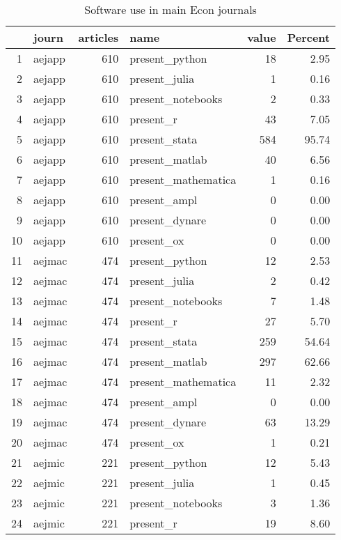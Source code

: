 \begin{table}[ht]
\centering
\caption{Software use in main Econ journals} 
\label{tab:software:byjournal}
\begin{tabular}{rlrlrr}
  \hline
 & journ & articles & name & value & Percent \\ 
  \hline
1 & aejapp & 610 & present\_python &  18 & 2.95 \\ 
  2 & aejapp & 610 & present\_julia &   1 & 0.16 \\ 
  3 & aejapp & 610 & present\_notebooks &   2 & 0.33 \\ 
  4 & aejapp & 610 & present\_r &  43 & 7.05 \\ 
  5 & aejapp & 610 & present\_stata & 584 & 95.74 \\ 
  6 & aejapp & 610 & present\_matlab &  40 & 6.56 \\ 
  7 & aejapp & 610 & present\_mathematica &   1 & 0.16 \\ 
  8 & aejapp & 610 & present\_ampl &   0 & 0.00 \\ 
  9 & aejapp & 610 & present\_dynare &   0 & 0.00 \\ 
  10 & aejapp & 610 & present\_ox &   0 & 0.00 \\ 
  11 & aejmac & 474 & present\_python &  12 & 2.53 \\ 
  12 & aejmac & 474 & present\_julia &   2 & 0.42 \\ 
  13 & aejmac & 474 & present\_notebooks &   7 & 1.48 \\ 
  14 & aejmac & 474 & present\_r &  27 & 5.70 \\ 
  15 & aejmac & 474 & present\_stata & 259 & 54.64 \\ 
  16 & aejmac & 474 & present\_matlab & 297 & 62.66 \\ 
  17 & aejmac & 474 & present\_mathematica &  11 & 2.32 \\ 
  18 & aejmac & 474 & present\_ampl &   0 & 0.00 \\ 
  19 & aejmac & 474 & present\_dynare &  63 & 13.29 \\ 
  20 & aejmac & 474 & present\_ox &   1 & 0.21 \\ 
  21 & aejmic & 221 & present\_python &  12 & 5.43 \\ 
  22 & aejmic & 221 & present\_julia &   1 & 0.45 \\ 
  23 & aejmic & 221 & present\_notebooks &   3 & 1.36 \\ 
  24 & aejmic & 221 & present\_r &  19 & 8.60 \\ 

\end{tabular}
\end{table}
